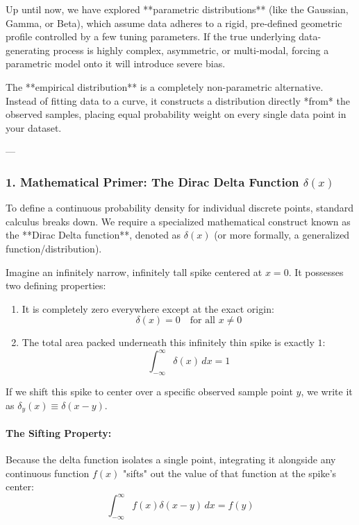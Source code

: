 \documentclass{article}
\begin{document}
Up until now, we have explored **parametric distributions** (like the Gaussian, Gamma, or Beta), which assume data adheres to a rigid, pre-defined geometric profile controlled by a few tuning parameters. If the true underlying data-generating process is highly complex, asymmetric, or multi-modal, forcing a parametric model onto it will introduce severe bias.

The **empirical distribution** is a completely non-parametric alternative. Instead of fitting data to a curve, it constructs a distribution directly *from* the observed samples, placing equal probability weight on every single data point in your dataset.

---

\subsubsection*{1. Mathematical Primer: The Dirac Delta Function $\delta(x)$}

To define a continuous probability density for individual discrete points, standard calculus breaks down. We require a specialized mathematical construct known as the **Dirac Delta function**, denoted as $\delta(x)$ (or more formally, a generalized function/distribution).

Imagine an infinitely narrow, infinitely tall spike centered at $x = 0$. It possesses two defining properties:
\begin{enumerate}
    \item It is completely zero everywhere except at the exact origin:
    \begin{equation*}
    \delta(x) = 0 \quad \text{for all } x \neq 0
    \end{equation*}
    \item The total area packed underneath this infinitely thin spike is exactly $1$:
    \begin{equation*}
    \int_{-\infty}^{\infty} \delta(x) \, dx = 1
    \end{equation*}
\end{enumerate}

If we shift this spike to center over a specific observed sample point $y$, we write it as $\delta_y(x) \equiv \delta(x - y)$. 

\paragraph{The Sifting Property:}
Because the delta function isolates a single point, integrating it alongside any continuous function $f(x)$ "sifts" out the value of that function at the spike's center:
\begin{equation*}
\int_{-\infty}^{\infty} f(x) \delta(x - y) \, dx = f(y)
\end{equation*}
\end{document}
